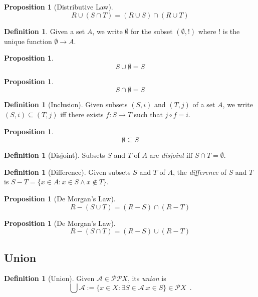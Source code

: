 \documentclass{book}
\newtheorem{prop}[ax]{Proposition}
\theoremstyle{definition}
\newtheorem{df}[ax]{Definition}
\begin{document}
\begin{prop}[Distributive Law]
\[ R \cup (S \cap T) = (R \cup S) \cap (R \cup T) \]
\end{prop}

\begin{df}
Given a set $A$, we write $\emptyset$ for the subset $(\emptyset, !)$ where $!$ is the unique function $\emptyset \rightarrow A$.
\end{df}

\begin{prop}
\[ S \cup \emptyset = S \]
\end{prop}

\begin{prop}
\[ S \cap \emptyset = S \]
\end{prop}

\begin{df}[Inclusion]
Given subsets $(S,i)$ and $(T,j)$ of a set $A$, we write $(S,i) \subseteq (T,j)$ iff there exists $f : S \rightarrow T$ such that $j \circ f = i$.
\end{df}

\begin{prop}
\[ \emptyset \subseteq S \]
\end{prop}

\begin{df}[Disjoint]
Subsets $S$ and $T$ of $A$ are \emph{disjoint} iff $S \cap T = \emptyset$.
\end{df}

\begin{df}[Difference]
Given subsets $S$ and $T$ of $A$, the \emph{difference} of $S$ and $T$ is $S - T = \{ x \in A : x \in S \wedge x \notin T \}$.
\end{df}

\begin{prop}[De Morgan's Law]
\[ R - (S \cup T) = (R - S) \cap (R - T) \]
\end{prop}

\begin{prop}[De Morgan's Law]
\[ R - (S \cap T) = (R - S) \cup (R - T) \]
\end{prop}

\subsection{Union} %

\begin{df}[Union]
Given $\mathcal{A} \in \mathcal{P} \mathcal{P} X$, its \emph{union} is
\[ \bigcup \mathcal{A} := \{ x \in X : \exists S \in \mathcal{A}. x \in S \} \in \mathcal{P} X \enspace . \]
\end{df}
\end{document}
